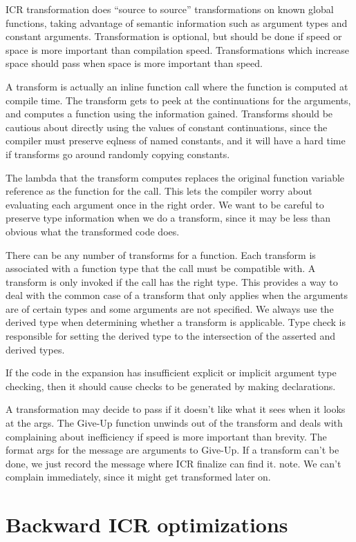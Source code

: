 ICR transformation does ``source to source'' transformations on known global
functions, taking advantage of semantic information such as argument types and
constant arguments.  Transformation is optional, but should be done if speed or
space is more important than compilation speed.  Transformations which increase
space should pass when space is more important than speed.

A transform is actually an inline function call where the function is computed
at compile time.  The transform gets to peek at the continuations for the
arguments, and computes a function using the information gained.  Transforms
should be cautious about directly using the values of constant continuations,
since the compiler must preserve eqlness of named constants, and it will have a
hard time if transforms go around randomly copying constants.

The lambda that the transform computes replaces the original function variable
reference as the function for the call.  This lets the compiler worry about
evaluating each argument once in the right order.  We want to be careful to
preserve type information when we do a transform, since it may be less than
obvious what the transformed code does.

There can be any number of transforms for a function.  Each transform is
associated with a function type that the call must be compatible with.  A
transform is only invoked if the call has the right type.  This provides a way
to deal with the common case of a transform that only applies when the
arguments are of certain types and some arguments are not specified.  We always
use the derived type when determining whether a transform is applicable.  Type
check is responsible for setting the derived type to the intersection of the
asserted and derived types.

If the code in the expansion has insufficient explicit or implicit argument
type checking, then it should cause checks to be generated by making
declarations.

A transformation may decide to pass if it doesn't like what it sees when it
looks at the args.  The Give-Up function unwinds out of the transform and deals
with complaining about inefficiency if speed is more important than brevity.
The format args for the message are arguments to Give-Up.  If a transform can't
be done, we just record the message where ICR finalize can find it.  note.  We
can't complain immediately, since it might get transformed later on.

\section{Backward ICR optimizations}

